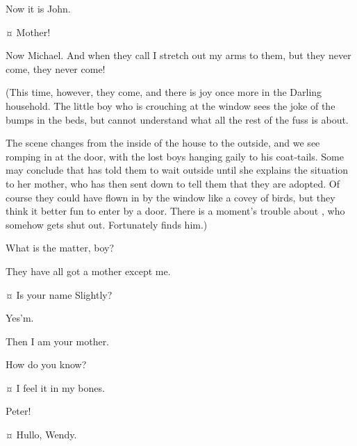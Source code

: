 \begin{drama}
\mrsdarlingspeaks
Now it is John.

\michaelspeaks {}¤
Mother!

\mrsdarlingspeaks
Now Michael.
And when they call I stretch out my arms to them, but they never come, they never come!

\begin{stagedir}
(This time, however, they come, and there is joy once more in the Darling household.
The little boy who is crouching at the window sees the joke of the bumps in the beds,
but cannot understand what all the rest of the fuss is about.

The scene changes from the inside of the house to the outside,
and we see \mrdarling romping in at the door, with the lost boys hanging gaily to his coat‐tails.
Some may conclude that \wendy has told them to wait outside until she explains the situation to her mother,
who has then sent \mrdarling down to tell them that they are adopted.
Of course they could have flown in by the window like a covey of birds,
but they think it better fun to enter by a door.
There is a moment’s trouble about \slightly, who somehow gets shut out.
Fortunately \liza finds him.)
\end{stagedir}

\lizaspeaks
What is the matter, boy?

\slightlyspeaks
They have all got a mother except me.

\lizaspeaks {}¤
Is your name Slightly?

\slightlyspeaks
Yes’m.

\lizaspeaks
Then I am your mother.

\slightlyspeaks
How do you know?

\lizaspeaks {}¤
I feel it in my bones.


\wendyspeaks
Peter!

\peterspeaks {}¤
Hullo, Wendy.



\end{drama}
